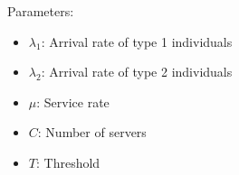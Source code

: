 \begin{frame}
\begin{figure}[h]
    \end{figure}

    Parameters:
    \begin{itemize}
        \item \( \lambda_1 \): Arrival rate of type 1 individuals
        \item \( \lambda_2 \): Arrival rate of type 2 individuals
        \item \( \mu \): Service rate
        \item \( C \): Number of servers
        \item \( T \): Threshold
    \end{itemize}
\end{frame}


